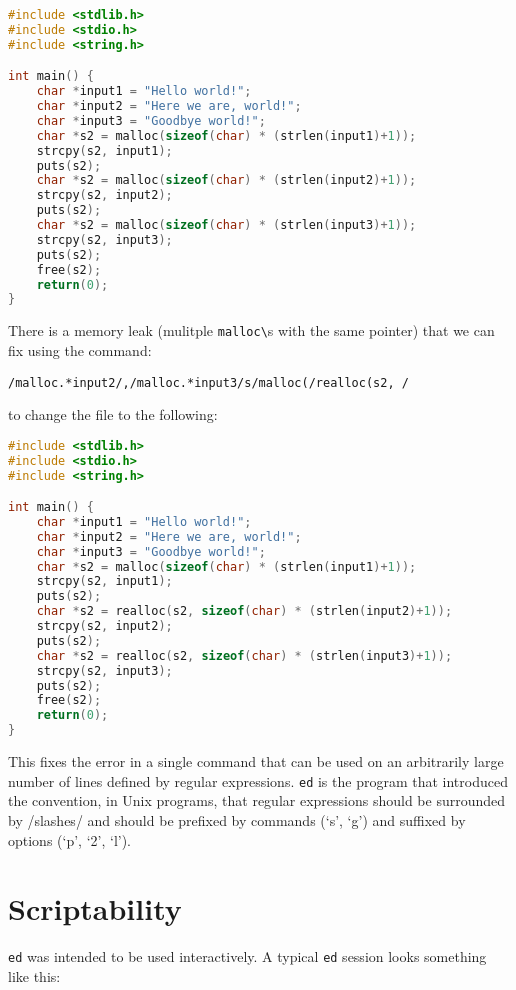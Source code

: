\documentclass[12pt]{article}
\begin{document}
\begin{lstlisting}[language=c]
#include <stdlib.h>
#include <stdio.h>
#include <string.h>

int main() {
    char *input1 = "Hello world!";
    char *input2 = "Here we are, world!";
    char *input3 = "Goodbye world!";
    char *s2 = malloc(sizeof(char) * (strlen(input1)+1));
    strcpy(s2, input1);
    puts(s2);
    char *s2 = malloc(sizeof(char) * (strlen(input2)+1));
    strcpy(s2, input2);
    puts(s2);
    char *s2 = malloc(sizeof(char) * (strlen(input3)+1));
    strcpy(s2, input3);
    puts(s2);
    free(s2);
    return(0);
}
\end{lstlisting}

There is a memory leak (mulitple \lstinline{malloc\}s with the same pointer) that we
can fix using the command:

\begin{lstlisting}
/malloc.*input2/,/malloc.*input3/s/malloc(/realloc(s2, /

\end{lstlisting}
to change the file to the following:

\begin{lstlisting}[language=c]
#include <stdlib.h>
#include <stdio.h>
#include <string.h>

int main() {
    char *input1 = "Hello world!";
    char *input2 = "Here we are, world!";
    char *input3 = "Goodbye world!";
    char *s2 = malloc(sizeof(char) * (strlen(input1)+1));
    strcpy(s2, input1);
    puts(s2);
    char *s2 = realloc(s2, sizeof(char) * (strlen(input2)+1));
    strcpy(s2, input2);
    puts(s2);
    char *s2 = realloc(s2, sizeof(char) * (strlen(input3)+1));
    strcpy(s2, input3);
    puts(s2);
    free(s2);
    return(0);
}
\end{lstlisting}

This fixes the error in a single command that can be used on an arbitrarily large
number of lines defined by regular expressions.
\lstinline{ed} is the program that introduced the convention,
in Unix programs, that regular expressions should be surrounded
by /slashes/ and should be prefixed by commands (`s', `g') and suffixed
by options (`p', `2', `l').

\section{Scriptability}

\lstinline{ed} was intended to be used interactively. A typical \lstinline{ed}
session looks something like this:
\end{document}

